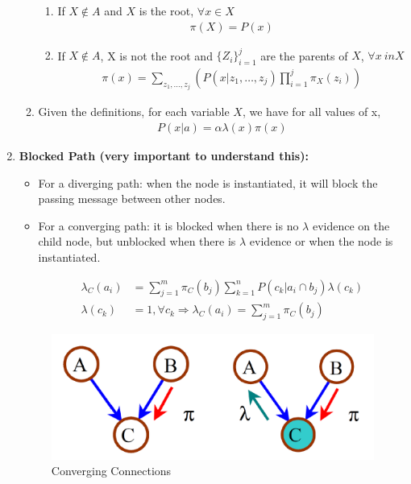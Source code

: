\documentclass[12pt,twoside]{article}
\begin{document}
\begin{enumerate}
\begin{enumerate}
\begin{enumerate}
\item If $X\notin A$ and $X$ is the root, $\forall x\in X $
\begin{align*}
\pi(X) = P(x)
\end{align*}

\item If $X\notin A$, X is not the root and $\lbrace Z_i \rbrace_{i=1}^j$ are the parents of $X$, $\forall x \ in X$
\begin{align*}
\pi(x) = \sum_{z_1,\dots, z_j} \left(P(x\vert z_1,\dots, z_j) \prod_{i=1}^j \pi_X(z_i)\right)
\end{align*}

\end{enumerate}
\item Given the definitions, for each variable $X$, we have for all values of x,
\begin{align*}
P(x\vert a) = \alpha \lambda(x) \pi(x)
\end{align*}

\end{enumerate}

	\item \textbf{Blocked Path (very important to understand this):}
		\begin{itemize}
			\item For a diverging path: when the node is instantiated, it will block the passing message between other nodes.
			\item For a converging path: it is blocked when there is no $\lambda$ evidence on the child node, but unblocked when there is $\lambda$ evidence or when the node is instantiated.

			\begin{align*}
				\lambda_C(a_i)& = \sum_{j=1}^m \pi_C (b_j) \sum_{k=1}^n P(c_k \vert a_i \cap b_j) \lambda(c_k)\\
				\lambda(c_k) & = 1, \forall c_k \Rightarrow \lambda_C(a_i) = \sum_{j=1}^m \pi_C (b_j) 
			\end{align*}
		\end{itemize}
		
\begin{figure}[H]
\begin{center}
\includegraphics[width = 0.50\hsize]{./figures/ConvergingConnection.png} %
\caption{Converging Connections} %
\label{fig:NaiveBayes} %
\end{center}
\end{figure}


\end{enumerate}
\end{document}
